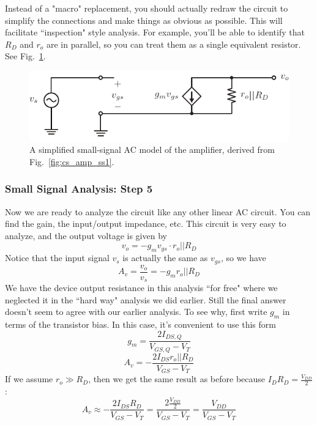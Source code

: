 Instead of a "macro" replacement, you should actually redraw the circuit to simplify the connections and make things as obvious as possible. This will facilitate ``inspection" style analysis. For example, you'll be able to identify that $R_D$ and $r_o$ are in parallel, so you can treat them as a single equivalent resistor.  See Fig.~\ref{fig:cs_amp_ss2}.



\begin{figure}[tb]
\begin{center}
\includegraphics[scale=1]{cs_amp_ss2}
\end{center}
\caption{A simplified small-signal AC model of the amplifier, derived from Fig.~\ref{fig:cs_amp_ss1}. } \label{fig:cs_amp_ss2}
\end{figure}

 
 





\subsubsection{Small Signal Analysis:  Step 5}

Now we are ready to analyze the circuit like any other linear AC circuit.  You can find the gain, the input/output impedance, etc.  This circuit is very easy to analyze, and the output voltage is given by
%
\begin{equation}
	v_o = -g_m v_{gs} \cdot r_o || R_D 
\end{equation}
%
Notice that the input signal $v_s$ is actually the same as $v_{gs}$, so we have
%
\begin{equation}
	A_v = \frac{v_o}{v_s} = -g_m r_o || R_D
\end{equation}
%
We have the device output resistance in this analysis ``for free" where we neglected it in the ``hard way" analysis we did earlier.   Still the final answer doesn't seem to agree with our earlier analysis.  To see why, first write $g_m$ in terms of the transistor bias.  In this case, it's convenient to use this form
\begin{equation}
	g_m = \frac{2 I_{DS,Q}}{V_{GS,Q}-V_T}
\end{equation}
%
\begin{equation}
	A_v =  -\frac{2 I_{DS} r_o||R_D}{V_{GS}-V_T}
\end{equation}
%
If we assume $r_o \gg R_D$, then we get the same result as before because $I_D R_D = \frac{V_{DD}}{2}$:
% 
\begin{equation}
	A_v \approx  -\frac{2 I_{DS} R_D}{V_{GS}-V_T} =
	\frac{2\frac{V_{DD}}{2} }{V_{GS}-V_T} = \frac{V_{DD}}{V_{GS}-V_T}
\end{equation}
%






